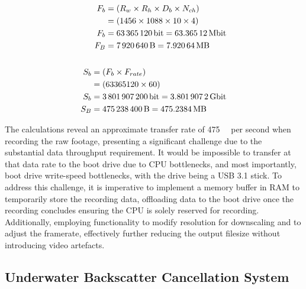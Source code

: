 \begin{align}
    \begin{split} \label{eq:raw_data_per_frame}
        F_b & = (R_w \times R_h \times D_b \times N_{ch}) \\
        & = (1456 \times 1088 \times 10 \times 4) \\
        F_b & = \SI{63365120}{\bit} = \SI{63.36512}{\mega\bit} \\
        F_B & = \SI{7920640}{\byte} = \SI{7.92064}{\mega\byte} 
    \end{split} \\
    \notag \\
    \begin{split} \label{eq:raw_data_per_second}
        S_b & = (F_b \times F_{rate}) \\
        & = (63365120 \times 60) \\
        S_b & = \SI{3801907200}{\bit} = \SI{3.8019072}{\giga\bit} \\
        S_B & = \SI{475238400}{\byte} = \SI{475.2384}{\mega\byte} 
    \end{split}
\end{align}

The calculations reveal an approximate transfer rate of \SI{475}{\mega\byte} per second when recording the raw footage, presenting a significant challenge due to the substantial data throughput requirement. It would be impossible to transfer at that data rate to the boot drive due to CPU bottlenecks, and most importantly, boot drive write-speed bottlenecks, with the drive being a USB 3.1 stick. To address this challenge, it is imperative to implement a memory buffer in RAM to temporarily store the recording data, offloading data to the boot drive once the recording concludes ensuring the CPU is solely reserved for recording. Additionally, employing functionality to modify resolution for downscaling and to adjust the framerate, effectively further reducing the output filesize without introducing video artefacts.

\subsection{Underwater Backscatter Cancellation System}
\label{designsystem}

